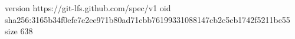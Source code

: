 version https://git-lfs.github.com/spec/v1
oid sha256:3165b34f0efe7e2ee971b80ad71cbb76199331088147cb2c5cb1742f5211be55
size 638
